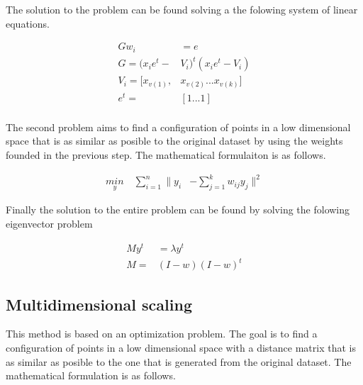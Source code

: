 \documentclass[a0,portrait]{a0poster}
\begin{document}
\begin{multicols}{3}
    The solution to the problem can be found solving a the folowing system of
    linear equations.

        \begin{equation*}
            \begin{aligned}
               Gw_i &= e\\
               G = (x_i e^t -& V_i)^t (x_i e^t - V_i)\\
               V_i = [x_{v(1)}, &x_{v(2)} ... x_{v(k)}]\\
               e^t =& [1 ... 1]\\
            \end{aligned}
        \end{equation*}

    The second problem aims to find a configuration of points in a low
    dimensional space that is as similar as posible to the original dataset by
    using the weights founded in the previous step. The mathematical formulaiton
    is as follows.

        \begin{equation*}
            \begin{aligned}
               \underset{y}{min} \quad \sum_{i=1}^n \lVert y_i &- \sum_{j=1}^k w_{ij} y_j \rVert^2
            \end{aligned}
        \end{equation*}

    Finally the solution to the entire problem can be found by solving the
    folowing eigenvector problem

        \begin{equation*}
            \begin{aligned}
               M y^t &= \lambda y^t\\
               M =& (I-w)(I-w)^t
            \end{aligned}
        \end{equation*}

    \subsection*{Multidimensional scaling}

    This method is based on an optimization problem. The goal is to find a
    configuration of points in a low dimensional space with a distance matrix
    that is as similar as posible to the one that is generated from the original
    dataset. The mathematical formulation is as follows.


\end{multicols}
\end{document}
